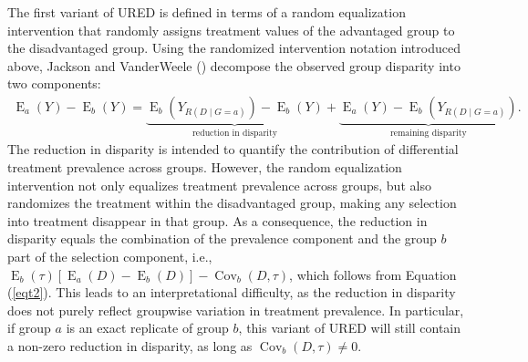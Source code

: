 \documentclass[12pt,a4paper]{article}
\newcommand{\Cov}{\operatorname{Cov}}
\newcommand{\E}{\operatorname{E}}
\begin{document}
The first variant of URED is defined in terms of a random equalization intervention that randomly assigns treatment values of the advantaged group to the disadvantaged group.
Using the randomized intervention notation introduced above, Jackson and VanderWeele 
 (\citeyear{jackson_decomposition_2018}) decompose the observed group disparity into two components:
\begin{gather}
\E_a(Y)-\E_b(Y)=\underbrace{\E_b \left(Y_{R(D \mid G=a)} \right)-\E_b(Y)}_{\text{reduction in disparity}} + \underbrace{\E_a(Y)-\E_b \left(Y_{R(D \mid G=a)} \right)}_{\text{remaining disparity}} .  \nonumber 
\end{gather}
The reduction in disparity is intended to quantify the contribution of differential treatment prevalence across groups. 
However, the random equalization intervention not only equalizes treatment prevalence across groups, but also randomizes the treatment within the disadvantaged group, making any selection into treatment disappear in that group. As a consequence, the reduction in disparity equals the combination of the prevalence component and the group $b$ part of the selection component, i.e., $\E_b(\tau)[\E_a(D)-\E_b(D)]-\Cov_b(D, \tau)$, which follows from Equation (\ref{eqt2}). This leads to an interpretational difficulty, as the reduction in disparity does not purely reflect groupwise variation in treatment prevalence. In particular, if group $a$ is an exact replicate of group $b$, this variant of URED will still contain a non-zero reduction in disparity, as long as $\Cov_b(D, \tau) \neq 0$.
\end{document}
